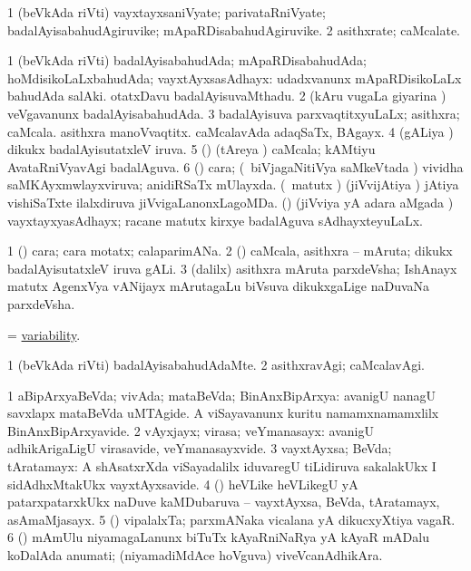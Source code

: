 \bentry
{} 
\gl{\nA}
\expl{}
\bmng
\bnum
\num{1} (beVkAda riVti) vayxtayxsaniVyate; parivataRniVyate; badalAyisabahudAgiruvike; mApaRDisabahudAgiruvike. 
\num{2} asithxrate; caMcalate. 
\enum
\emng
\eentry

\bentry
{} 
\gl{\gu}
\expl{}
\bmng
\bnum
\num{1} (beVkAda riVti) badalAyisabahudAda; mApaRDisabahudAda; hoMdisikoLaLxbahudAda; vayxtAyxsasAdhayx:  udadxvanunx mApaRDisikoLaLx bahudAda salAki.  otatxDavu badalAyisuvaMthadu. 
\num{2} (kAru \mo vugaLa giyarina \vi) veVgavanunx badalAyisabahudAda. 
\num{3} badalAyisuva parxvaqtitxyuLaLx; asithxra; caMcala.  asithxra manoVvaqtitx.  caMcalavAda adaqSaTx, BAgayx. 
\num{4} (gALiya \vi) dikukx badalAyisutatxleV iruva. 
\num{5} (\Kavi) (tAreya \vi) caMcala; kAMtiyu AvataRniVyavAgi badalAguva. 
\num{6} (\ga) cara; (\sA\ biVjagaNitiVya saMkeVtada \vi) vividha saMKAyxmwlayxviruva; anidiRSaTx mUlayxda. 
\banum
{} (\jiVvi\ matutx \savi) (jiVvijAtiya \vi) jAtiya vishiSaTxte ilalxdiruva jiVvigaLanonxLagoMDa. 
 (\jiVvi) (jiVviya yA adara aMgada \vi) vayxtayxyasAdhayx; racane matutx kirxye badalAguva sAdhayxteyuLaLx. 
\eanum
\numie
\enum
\emng
\eentry

\bentry
{} 
\gl{\nA}
\expl{}
\bmng
\bnum
\num{1} (\ga) cara; cara motatx; calaparimANa. 
\num{2} (\nw) caMcala, asithxra -- mAruta; dikukx badalAyisutatxleV iruva gALi. 
\num{3} (\bava dalilx) asithxra mAruta parxdeVsha; IshAnayx matutx AgenxVya vANijayx mArutagaLu biVsuva dikukxgaLige naDuvaNa parxdeVsha. 
\enum
\emng
\eentry

\bentry
{} 
\gl{\nA}
\expl{}
\bmng
 = \hyperlink{variability}{variability}. 
\emng
\eentry

\bentry
{} 
\gl{\kirxvi}
\expl{}
\bmng
\bnum
\num{1} (beVkAda riVti) badalAyisabahudAdaMte. 
\num{2} asithxravAgi; caMcalavAgi. 
\enum
\emng
\eentry

\bentry
{} 
\gl{\nA}
\expl{}
\bmng
\bnum
\num{1} aBipArxyaBeVda; vivAda; mataBeVda; BinAnxBipArxya:  avanigU nanagU savxlapx mataBeVda uMTAgide.  A viSayavanunx kuritu namamxnamamxlilx BinAnxBipArxyavide. 
\num{2} vAyxjayx; virasa; veYmanasayx:  avanigU adhikArigaLigU virasavide, veYmanasayxvide. 
\num{3} vayxtAyxsa; BeVda; tAratamayx:  A shAsatxrXda viSayadalilx iduvaregU tiLidiruva sakalakUkx I sidAdhxMtakUkx vayxtAyxsavide. 
\num{4} (\nAyxshA) heVLike heVLikegU yA patarxpatarxkUkx naDuve kaMDubaruva -- vayxtAyxsa, BeVda, tAratamayx, asAmaMjasayx. 
\num{5} (\saMshA) vipalalxTa; parxmANaka vicalana yA dikucxyXtiya  vagaR. 
\num{6} (\ame) mAmUlu niyamagaLanunx biTuTx kAyaRniNaRya yA kAyaR mADalu koDalAda anumati; (niyamadiMdAce hoVguva) viveVcanAdhikAra. 
\enum
\emng
\eentry

